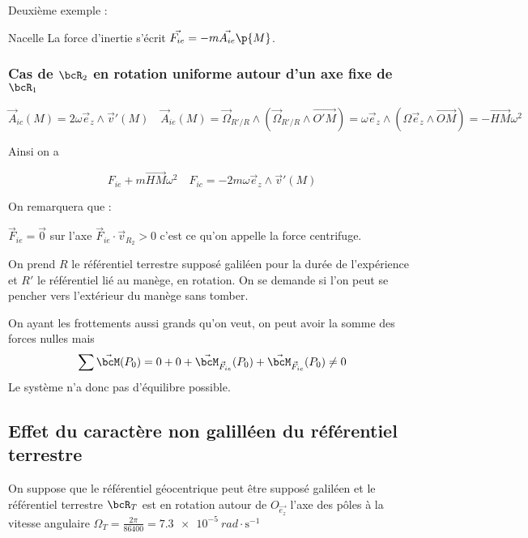     Deuxième exemple :
    \begin{example}{Nacelle}{}
        La force d'inertie s'écrit $\vec{F_{ie}} = -m\vec{A_{ie}}\p{M}$.
    \end{example}
    
    \subsubsection{Cas de $\bcR_2$ en rotation uniforme autour d'un axe fixe de $\bcR_1$}

    \[\vec A_{ic}(M) = 2 \omega\vec e_z \wedge \vec v'(M) \quad \vec A_{ie}(M) = \vec\Omega_{R'/R} \wedge \left(\vec\Omega_{R'/R} \wedge \vec{O'M} \right) = \omega\vec e_z \wedge (\Omega\vec e_z \wedge \vec{OM}) = - \vec{HM} \omega^2 \]
    \begin{center}Ainsi on a\end{center} \[ F_{ie} + m \vec{HM} \omega^2 \quad F_{ic} = -2m \omega \vec e_z \wedge \vec v'(M)\]

    On remarquera que :
    \begin{enumerate}
        \itt \(\vec F_{ie} = \vec 0\) sur l'axe
        \itt \(\vec F_{ie} \cdot \vec v_{R_2} > 0\) c'est ce qu'on appelle la force centrifuge.
    \end{enumerate}

    \begin{example}{}{}

        On prend \(R\) le référentiel terrestre supposé galiléen pour la durée de l'expérience et \(R'\) le référentiel lié au manège, en rotation. On se demande si l'on peut se pencher vers l'extérieur du manège sans tomber.

        On ayant les  frottements aussi grands qu'on veut, on peut avoir la somme des forces nulles mais 
        \[\sum \vec\bcM(P_0) = 0 + 0 + \vec\bcM_{\vec F_{ie}}(P_0) + \vec\bcM_{\vec F_{ic}}(P_0) \neq 0\]
        Le système n'a donc pas d'équilibre possible.
    \end{example}
    
    \subsection{Effet du caractère non galilléen du référentiel terrestre}

    On suppose que le référentiel géocentrique peut être supposé galiléen et le référentiel terrestre \(\bcR_T\) est en rotation autour de \(O_{\vec{e_z}}\)  l'axe des pôles à la vitesse angulaire \(\Omega_T = \frac{2\pi}{86400} = \SI{7.3e-5}{rad \cdot \second^{-1}}\)

